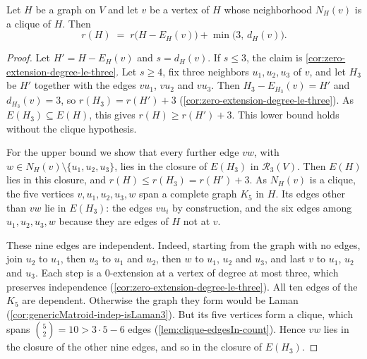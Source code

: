 \begin{corollary}
  \label{cor:zero-extension-clique-rank}
  \leanok
  Let $H$ be a graph on $V$ and let $v$ be a vertex of $H$ whose
  neighborhood $N_H(v)$ is a clique of $H$. Then
  \[
    r(H) \;=\; r\bigl(H - E_H(v)\bigr) + \min\bigl(3,\, d_H(v)\bigr).
  \]
\end{corollary}
\begin{proof}
  \leanok
  Let $H' = H - E_H(v)$ and $s = d_H(v)$. If $s \le 3$, the claim is
  \cref{cor:zero-extension-degree-le-three}. Let $s \ge 4$, fix three
  neighbors $u_1, u_2, u_3$ of $v$, and let $H_3$ be $H'$ together with
  the edges $vu_1$, $vu_2$ and $vu_3$. Then $H_3 - E_{H_3}(v) = H'$ and
  $d_{H_3}(v) = 3$, so $r(H_3) = r(H') + 3$
  (\cref{cor:zero-extension-degree-le-three}). As
  $E(H_3) \subseteq E(H)$, this gives $r(H) \ge r(H') + 3$. This lower
  bound holds without the clique hypothesis.

  For the upper bound we show that every further edge $vw$, with
  $w \in N_H(v) \setminus \{u_1, u_2, u_3\}$, lies in the closure of
  $E(H_3)$ in $\mathcal{R}_3(V)$. Then $E(H)$ lies in this closure, and
  $r(H) \le r(H_3) = r(H') + 3$. As $N_H(v)$ is a clique, the five
  vertices $v, u_1, u_2, u_3, w$ span a complete graph $K_5$ in $H$. Its
  edges other than $vw$ lie in $E(H_3)$: the edges $vu_i$ by
  construction, and the six edges among $u_1, u_2, u_3, w$ because they
  are edges of $H$ not at $v$.

  These nine edges are independent. Indeed, starting from the graph with
  no edges, join $u_2$ to $u_1$, then $u_3$ to $u_1$ and $u_2$, then $w$
  to $u_1$, $u_2$ and $u_3$, and last $v$ to $u_1$, $u_2$ and $u_3$.
  Each step is a $0$-extension at a vertex of degree at most three, which
  preserves independence (\cref{cor:zero-extension-degree-le-three}).
  All ten edges of the $K_5$ are dependent. Otherwise the graph they
  form would be Laman (\cref{cor:genericMatroid-indep-isLaman3}). But
  its five vertices form a clique, which spans
  $\binom{5}{2} = 10 > 3 \cdot 5 - 6$ edges
  (\cref{lem:clique-edgesIn-count}). Hence $vw$ lies in the closure of
  the other nine edges, and so in the closure of $E(H_3)$.
\end{proof}

